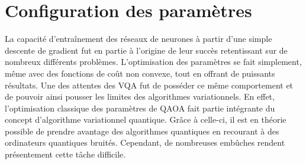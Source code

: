 
\section{Configuration des paramètres}
\label{subsec:configuration-des-parametres}

La capacité d'entraînement des réseaux de neurones à partir d'une simple descente de gradient fut en partie à l'origine de leur succès retentissant sur de nombreux différents problèmes. L'optimisation des paramètres se fait simplement, même avec des fonctions de coût non convexe, tout en offrant de puissants résultats. Une des attentes des VQA fut de posséder ce même comportement et de pouvoir ainsi pousser les limites des algorithmes variationnels. En effet, l'optimisation classique des paramètres de QAOA fait partie intégrante du concept d'algorithme variationnel quantique. Grâce à celle-ci, il est en théorie possible de prendre avantage des algorithmes quantiques en recourant à des ordinateurs quantiques bruités. Cependant, de nombreuses embûches rendent présentement cette tâche difficile. 


